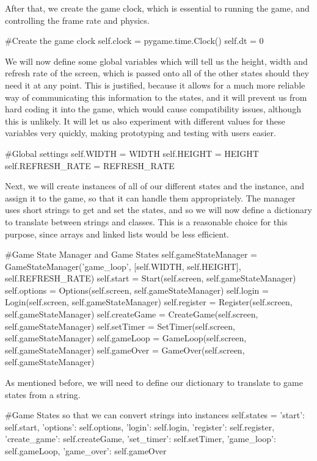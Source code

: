 After that, we create the game clock, which is essential to running the game, and controlling the frame rate and physics.
\vs
\begin{mpy}
        #Create the game clock
        self.clock = pygame.time.Clock()
        self.dt = 0
\end{mpy}
\vs
We will now define some global variables which will tell us the height, width and refresh rate of the screen, which is passed onto all of the other states should they need it at any point. This is justified, because it allows for a much more reliable way of communicating this information to the states, and it will prevent us from hard coding it into the game, which would cause compatibility issues, although this is unlikely. It will let us also experiment with different values for these variables very quickly, making prototyping and testing with users easier.
\vs
\begin{mpy}
        #Global settings
        self.WIDTH = WIDTH
        self.HEIGHT = HEIGHT
        self.REFRESH_RATE = REFRESH_RATE
\end{mpy}
\vs
Next, we will create instances of all of our different states and the  instance, and assign it to the game, so that it can handle them appropriately. The manager uses short strings to get and set the states, and so we will now define a dictionary to translate between strings and classes. This is a reasonable choice for this purpose, since arrays and linked lists would be less efficient. 
\vs
\begin{mpy}
        #Game State Manager and Game States
        self.gameStateManager = GameStateManager('game_loop', [self.WIDTH, self.HEIGHT], self.REFRESH_RATE)
        self.start = Start(self.screen, self.gameStateManager)
        self.options = Options(self.screen, self.gameStateManager)
        self.login = Login(self.screen, self.gameStateManager)
        self.register = Register(self.screen, self.gameStateManager)
        self.createGame = CreateGame(self.screen, self.gameStateManager)
        self.setTimer = SetTimer(self.screen, self.gameStateManager)
        self.gameLoop = GameLoop(self.screen, self.gameStateManager)
        self.gameOver = GameOver(self.screen, self.gameStateManager)
\end{mpy}
\vs
As mentioned before, we will need to define our dictionary to translate to game states from a string.
\vs
\begin{mpy}
        #Game States so that we can convert strings into instances
        self.states = {'start': self.start,
                    'options': self.options,
                    'login': self.login,
                    'register': self.register,
                    'create_game': self.createGame,
                    'set_timer': self.setTimer,
                    'game_loop': self.gameLoop,
                    'game_over': self.gameOver
        }
\end{mpy}

